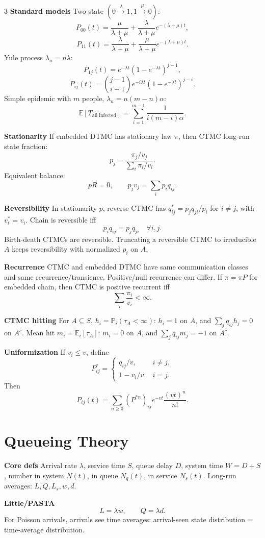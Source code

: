 \documentclass[a4paper,8pt,fleqn]{extarticle}
\newcommand{\E}{\mathbb{E}}
\newcommand{\PP}{\mathbb{P}}
\newcommand{\1}{\mathbf{1}}
\newcommand{\sub}[1]{\textbf{#1} }
\begin{document}
\begin{multicols}{3}
\sub{Standard models} Two-state \((0\xrightarrow{\lambda}1,1\xrightarrow{\mu}0)\):
\[
P_{00}(t)=\frac{\mu}{\lambda+\mu}+\frac{\lambda}{\lambda+\mu}e^{-(\lambda+\mu)t},
\]
\[
P_{11}(t)=\frac{\lambda}{\lambda+\mu}+\frac{\mu}{\lambda+\mu}e^{-(\lambda+\mu)t}.
\]
Yule process \(\lambda_n=n\lambda\):
\[
P_{1j}(t)=e^{-\lambda t}(1-e^{-\lambda t})^{j-1},
\]
\[
P_{ij}(t)=\binom{j-1}{i-1}e^{-i\lambda t}(1-e^{-\lambda t})^{j-i}.
\]
Simple epidemic with \(m\) people, \(\lambda_n=n(m-n)\alpha\):
\[
\E[T_{\text{all infected}}]=\sum_{i=1}^{m-1}\frac{1}{i(m-i)\alpha}.
\]

\sub{Stationarity} If embedded DTMC has stationary law \(\pi\), then CTMC long-run state fraction:
\[
p_j=\frac{\pi_j/v_j}{\sum_i \pi_i/v_i}.
\]
Equivalent balance:
\[
pR=0,\qquad p_jv_j=\sum_i p_i q_{ij}.
\]

\sub{Reversibility} In stationarity \(p\), reverse CTMC has \(q_{ij}^*=p_jq_{ji}/p_i\) for \(i\ne j\), with \(v_i^*=v_i\). Chain is reversible iff
\[
p_i q_{ij}=p_j q_{ji}\quad \forall i,j.
\]
Birth-death CTMCs are reversible. Truncating a reversible CTMC to irreducible \(A\) keeps reversibility with normalized \(p_i\) on \(A\).

\sub{Recurrence} CTMC and embedded DTMC have same communication classes and same recurrence/transience. Positive/null recurrence can differ. If \(\pi=\pi P\) for embedded chain, then CTMC is positive recurrent iff
\[
\sum_i \frac{\pi_i}{v_i}<\infty.
\]

\sub{CTMC hitting} For \(A\subseteq S\), \(h_i=\PP_i(\tau_A<\infty)\): \(h_i=1\) on \(A\), and \(\sum_j q_{ij}h_j=0\) on \(A^c\). Mean hit \(m_i=\E_i[\tau_A]\): \(m_i=0\) on \(A\), and \(\sum_j q_{ij}m_j=-1\) on \(A^c\).

\sub{Uniformization} If \(v_i\le v\), define
\[
P^*_{ij}=
\begin{cases}
q_{ij}/v,&i\ne j,\\
1-v_i/v,&i=j.
\end{cases}
\]
Then
\[
P_{ij}(t)=\sum_{n\ge0}(P^{*n})_{ij}e^{-vt}\frac{(vt)^n}{n!}.
\]

\section*{Queueing Theory}
\sub{Core defs} Arrival rate \(\lambda\), service time \(S\), queue delay \(D\), system time \(W=D+S\), number in system \(N(t)\), in queue \(N_q(t)\), in service \(N_s(t)\). Long-run averages: \(L,Q,L_s,w,d\).

\sub{Little/PASTA} 
\[
L=\lambda w,\qquad Q=\lambda d.
\]
For Poisson arrivals, arrivals see time averages: arrival-seen state distribution = time-average distribution.


\end{multicols}
\end{document}
